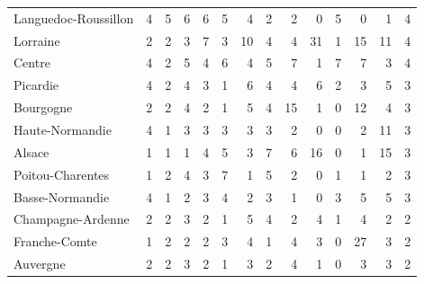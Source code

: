 \documentclass[11pt]{article}
\begin{document}
\begin{table}[H]
\begin{tabular}{lrrrrrrrrrrrrr}
Languedoc-Roussillon &          4 &          5 &          6 &          6 &          5 &          4 &          2 &          2 &          0 &          5 &          0 &          1 &          4 \\
Lorraine             &          2 &          2 &          3 &          7 &          3 &         10 &          4 &          4 &         31 &          1 &         15 &         11 &          4 \\
Centre               &          4 &          2 &          5 &          4 &          6 &          4 &          5 &          7 &          1 &          7 &          7 &          3 &          4 \\
Picardie             &          4 &          2 &          4 &          3 &          1 &          6 &          4 &          4 &          6 &          2 &          3 &          5 &          3 \\
Bourgogne            &          2 &          2 &          4 &          2 &          1 &          5 &          4 &         15 &          1 &          0 &         12 &          4 &          3 \\
Haute-Normandie      &          4 &          1 &          3 &          3 &          3 &          3 &          3 &          2 &          0 &          0 &          2 &         11 &          3 \\
Alsace               &          1 &          1 &          1 &          4 &          5 &          3 &          7 &          6 &         16 &          0 &          1 &         15 &          3 \\
Poitou-Charentes     &          1 &          2 &          4 &          3 &          7 &          1 &          5 &          2 &          0 &          1 &          1 &          2 &          3 \\
Basse-Normandie      &          4 &          1 &          2 &          3 &          4 &          2 &          3 &          1 &          0 &          3 &          5 &          5 &          3 \\
Champagne-Ardenne    &          2 &          2 &          3 &          2 &          1 &          5 &          4 &          2 &          4 &          1 &          4 &          2 &          2 \\
Franche-Comte        &          1 &          2 &          2 &          2 &          3 &          4 &          1 &          4 &          3 &          0 &         27 &          3 &          2 \\
Auvergne             &          2 &          2 &          3 &          2 &          1 &          3 &          2 &          4 &          1 &          0 &          3 &          3 &          2 \\

\end{tabular}
\end{table}
\end{document}
